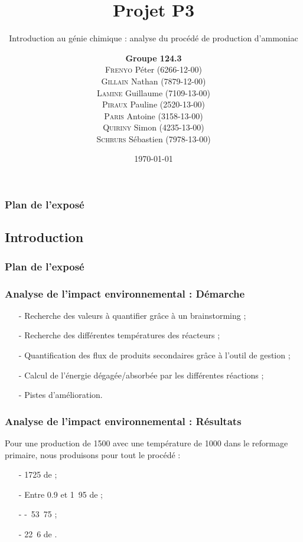 \documentclass{beamer}
\title{Projet P3}
\subtitle{Introduction au génie chimique : analyse du procédé de production d'ammoniac}
\author{\textbf{Groupe 124.3}\\
\textsc{Frenyo} Péter (6266-12-00)\\
\textsc{Gillain} Nathan (7879-12-00)\\
\textsc{Lamine} Guillaume (7109-13-00)\\
\textsc{Piraux} Pauline (2520-13-00)\\
\textsc{Paris} Antoine (3158-13-00)\\
\textsc{Quiriny} Simon (4235-13-00)\\
\textsc{Schrurs} Sébastien (7978-13-00)}
\date{\today}
\begin{document}
 
 
	\begin{frame} 
		\titlepage 
	\end{frame} 
	
	\begin{frame}
		\frametitle{Plan de l'exposé}
		\tableofcontents
	\end{frame}
	
	\begin{frame}
		\section{Introduction}
		\frametitle{Plan de l'exposé}
		\tableofcontents[currentsubsection,sectionstyle=show/shaded,subsectionstyle=show/shaded/hide]
	\end{frame}
	
	\begin{frame}
	\frametitle{Analyse de l'impact environnemental : Démarche}
	\begin{itemize}
		\item[-] Recherche des valeurs à quantifier grâce à un brainstorming ;
		\item[-] Recherche des différentes températures des réacteurs ;
		\item[-] Quantification des flux de produits secondaires grâce à l'outil de gestion ;
		\item[-] Calcul de l'énergie dégagée/absorbée par les différentes réactions ;
		\item[-] Pistes d'amélioration.
	\end{itemize}
	\end{frame}

	\begin{frame}
	\frametitle{Analyse de l'impact environnemental : Résultats}
	Pour une production de \unit{1500}{\ton\per\dday} avec une température 
	de \unit{1000}{\kelvin} dans le reformage primaire, nous 	produisons pour tout le procédé :
	\begin{itemize}
		\item[-] \unit{1725}{\ton\per\dday} de \chemform{CO_2} ;
		\item[-] Entre 0.9 et \unit{1.95}{\ton\per\dday} de \chemform{NO_x} ;
		\item[-] \unit{-53.75}{\kilo\joule\per\dday} ;
		\item[-] \unit{22.6}{\ton\per\dday} de \chemform{Ar}.
	\end{itemize}
	\end{frame}
\end{document}
